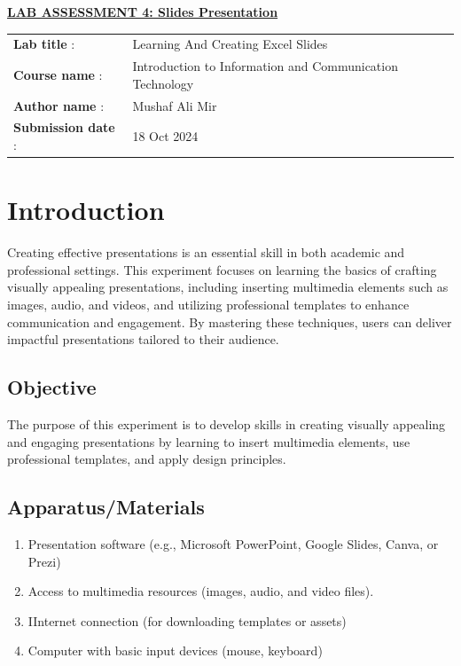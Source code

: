 \documentclass[a4paper,9pt]{article}
\begin{document}
\begin{center}
	{\Huge \bfseries \underline{ LAB ASSESSMENT 4: Slides Presentation} \par}
\end{center}
\noindent\begin{tabular}{@{}ll}
	\textbf{Lab title} :&Learning And Creating Excel Slides \\
	\textbf{Course name} :&  Introduction to Information and Communication Technology\\
	\textbf{Author name} : & Mushaf Ali Mir\\
	\textbf{Submission date} :& 18 Oct 2024 \\
\end{tabular}

\section*{Introduction}
\setcounter{section}{4}
\setcounter{figure}{0}  %
\setcounter{subsection}{0}

Creating effective presentations is an essential skill in both academic and professional settings. This experiment focuses on learning the basics of crafting visually appealing presentations, including inserting multimedia elements such as images, audio, and videos, and utilizing professional templates to enhance communication and engagement. By mastering these techniques, users can deliver impactful presentations tailored to their audience.

\subsection{Objective}
The purpose of this experiment is to develop skills in creating visually appealing and engaging presentations by learning to insert multimedia elements, use professional templates, and apply design principles.
\subsection{Apparatus/Materials}
\begin{enumerate}
	\item Presentation software (e.g., Microsoft PowerPoint, Google Slides, Canva, or Prezi)
	\item Access to multimedia resources (images, audio, and video files).
	\item IInternet connection (for downloading templates or assets)
	\item Computer with basic input devices (mouse, keyboard)
	
\end{enumerate}
\end{document}
